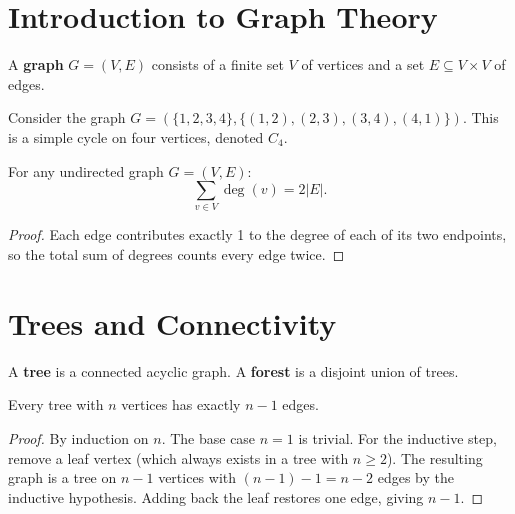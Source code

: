 \documentclass[
    language=english,
    doctype=lecture-notes,
    institution=none,
]{../../omnilatex}
\begin{document}
\maketitle
\tableofcontents
\newpage

\section{Introduction to Graph Theory}

\begin{definition}
A \textbf{graph} $G = (V, E)$ consists of a finite set $V$ of vertices
and a set $E \subseteq V \times V$ of edges.
\end{definition}

\begin{example}
Consider the graph $G = (\{1,2,3,4\}, \{(1,2),(2,3),(3,4),(4,1)\})$.
This is a simple cycle on four vertices, denoted $C_4$.
\end{example}

\begin{theorem}
For any undirected graph $G = (V, E)$:
\[
    \sum_{v \in V} \deg(v) = 2|E|.
\]
\end{theorem}

\begin{proof}
Each edge contributes exactly 1 to the degree of each of its two
endpoints, so the total sum of degrees counts every edge twice.
\end{proof}

\section{Trees and Connectivity}

\begin{definition}
A \textbf{tree} is a connected acyclic graph.  A \textbf{forest} is a
disjoint union of trees.
\end{definition}

\begin{lemma}
Every tree with $n$ vertices has exactly $n - 1$ edges.
\end{lemma}

\begin{proof}
By induction on $n$.  The base case $n = 1$ is trivial.
For the inductive step, remove a leaf vertex (which always exists
in a tree with $n \geq 2$).  The resulting graph is a tree on
$n - 1$ vertices with $(n-1) - 1 = n - 2$ edges by the inductive
hypothesis.  Adding back the leaf restores one edge, giving $n - 1$.
\end{proof}
\end{document}
